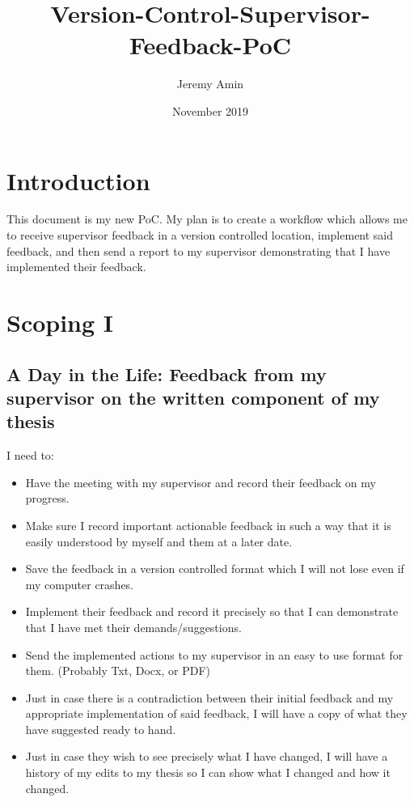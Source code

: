\documentclass{article}
\title{Version-Control-Supervisor-Feedback-PoC}
\author{Jeremy Amin}
\date{November 2019}
\begin{document}
\maketitle
\tableofcontents

\pagebreak

\section{Introduction}

This document is my new PoC. My plan is to create a workflow which allows me to receive supervisor feedback in a version controlled location, implement said feedback, and then send a report to my supervisor demonstrating that I have implemented their feedback.

\section{Scoping I}

\subsection{A Day in the Life: Feedback from my supervisor on the written component of my thesis}

I need to:
\begin{itemize}
    \item Have the meeting with my supervisor and record their feedback on my progress.
    \item Make sure I record important actionable feedback in such a way that it is easily understood by myself and them at a later date.
    \item Save the feedback in a version controlled format which I will not lose even if my computer crashes.
    \item Implement their feedback and record it precisely so that I can demonstrate that I have met their demands/suggestions.
    \item Send the implemented actions to my supervisor in an easy to use format for them. (Probably Txt, Docx, or PDF)
    \item Just in case there is a contradiction between their initial feedback and my appropriate implementation of said feedback, I will have a copy of what they have suggested ready to hand.
    \item Just in case they wish to see precisely what I have changed, I will have a history of my edits to my thesis so I can show what I changed and how it changed.
\end{itemize}
\end{document}
